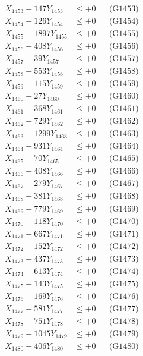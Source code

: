 \documentclass[a4paper,10pt]{article}
\begin{document}
{\begin{align}
X_{1453} - 147Y_{1453} &\leq +0 && \text{(G1453)} \\
X_{1454} - 126Y_{1454} &\leq +0 && \text{(G1454)} \\
X_{1455} - 1897Y_{1455} &\leq +0 && \text{(G1455)} \\
X_{1456} - 408Y_{1456} &\leq +0 && \text{(G1456)} \\
X_{1457} - 39Y_{1457} &\leq +0 && \text{(G1457)} \\
X_{1458} - 553Y_{1458} &\leq +0 && \text{(G1458)} \\
X_{1459} - 115Y_{1459} &\leq +0 && \text{(G1459)} \\
X_{1460} - 27Y_{1460} &\leq +0 && \text{(G1460)} \\
\allowbreak
X_{1461} - 368Y_{1461} &\leq +0 && \text{(G1461)} \\
X_{1462} - 729Y_{1462} &\leq +0 && \text{(G1462)} \\
X_{1463} - 1299Y_{1463} &\leq +0 && \text{(G1463)} \\
X_{1464} - 931Y_{1464} &\leq +0 && \text{(G1464)} \\
X_{1465} - 70Y_{1465} &\leq +0 && \text{(G1465)} \\
X_{1466} - 408Y_{1466} &\leq +0 && \text{(G1466)} \\
X_{1467} - 279Y_{1467} &\leq +0 && \text{(G1467)} \\
X_{1468} - 381Y_{1468} &\leq +0 && \text{(G1468)} \\
X_{1469} - 779Y_{1469} &\leq +0 && \text{(G1469)} \\
X_{1470} - 118Y_{1470} &\leq +0 && \text{(G1470)} \\
\allowbreak
X_{1471} - 667Y_{1471} &\leq +0 && \text{(G1471)} \\
X_{1472} - 152Y_{1472} &\leq +0 && \text{(G1472)} \\
X_{1473} - 437Y_{1473} &\leq +0 && \text{(G1473)} \\
X_{1474} - 613Y_{1474} &\leq +0 && \text{(G1474)} \\
X_{1475} - 143Y_{1475} &\leq +0 && \text{(G1475)} \\
X_{1476} - 169Y_{1476} &\leq +0 && \text{(G1476)} \\
X_{1477} - 581Y_{1477} &\leq +0 && \text{(G1477)} \\
X_{1478} - 751Y_{1478} &\leq +0 && \text{(G1478)} \\
X_{1479} - 1045Y_{1479} &\leq +0 && \text{(G1479)} \\
X_{1480} - 406Y_{1480} &\leq +0 && \text{(G1480)} \\

\end{align}}
\end{document}
